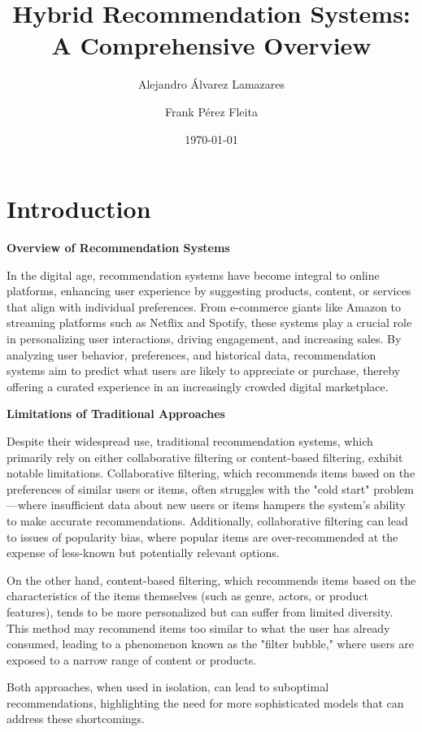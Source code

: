 \documentclass{article}
\title{Hybrid Recommendation Systems: A Comprehensive Overview}
\author{Alejandro Álvarez Lamazares \and Frank Pérez Fleita}
\date{\today}
\begin{document}
\maketitle

\section{Introduction}

\textbf{Overview of Recommendation Systems}

In the digital age, recommendation systems have become integral to online platforms, enhancing user experience by suggesting products, content, or services that align with individual preferences. From e-commerce giants like Amazon to streaming platforms such as Netflix and Spotify, these systems play a crucial role in personalizing user interactions, driving engagement, and increasing sales. By analyzing user behavior, preferences, and historical data, recommendation systems aim to predict what users are likely to appreciate or purchase, thereby offering a curated experience in an increasingly crowded digital marketplace.

\textbf{Limitations of Traditional Approaches}

Despite their widespread use, traditional recommendation systems, which primarily rely on either collaborative filtering or content-based filtering, exhibit notable limitations. Collaborative filtering, which recommends items based on the preferences of similar users or items, often struggles with the "cold start" problem—where insufficient data about new users or items hampers the system's ability to make accurate recommendations. Additionally, collaborative filtering can lead to issues of popularity bias, where popular items are over-recommended at the expense of less-known but potentially relevant options.

On the other hand, content-based filtering, which recommends items based on the characteristics of the items themselves (such as genre, actors, or product features), tends to be more personalized but can suffer from limited diversity. This method may recommend items too similar to what the user has already consumed, leading to a phenomenon known as the "filter bubble," where users are exposed to a narrow range of content or products.

Both approaches, when used in isolation, can lead to suboptimal recommendations, highlighting the need for more sophisticated models that can address these shortcomings.
\end{document}
